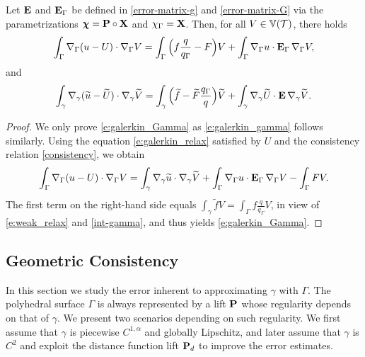 \begin{lemma}\label{L:GO}
Let ${\bf E}$ and ${\bf E}_\Gamma$ be defined in \eqref{error-matrix-g} and
  \eqref{error-matrix-G} via the parametrizations ${\boldsymbol \chi}={\bf P}\circ{\bf X}$
  and $\chi_\Gamma={\bf X}$. Then, for all $V \in \mathbb{V}(\mathcal{T})$, there holds
%
\begin{equation}\label{e:galerkin_Gamma}
\int_\Gamma \nabla_\Gamma (u-U) \cdot \nabla_\Gamma V = \int_\Gamma \Big(f \frac{q}{q_\Gamma}-F \Big) V + \int_\Gamma \nabla_\Gamma u \cdot {\bf E}_\Gamma \, \nabla_\Gamma V,
\end{equation}
and 
\begin{equation}\label{e:galerkin_gamma}
\int_\gamma \nabla_\gamma (\widetilde{u}-\widetilde{U}) \cdot \nabla_\gamma \widetilde{V} = \int_\gamma \Big (\widetilde f - \widetilde{F} \frac{q_\Gamma}{q} \Big) \widetilde{V} + \int_\gamma \nabla_\gamma \widetilde{U} \cdot {\bf E} \, \nabla_\gamma \widetilde{V}.
\end{equation}
%
\end{lemma}
%
\begin{proof}
We only prove \eqref{e:galerkin_Gamma} as \eqref{e:galerkin_gamma} follows similarly.
Using the equation \eqref{e:galerkin_relax} satisfied by $U$ and the consistency relation \eqref{consistency}, we obtain
%
\begin{align*}
\int_\Gamma \nabla_\Gamma (u-U) \cdot \nabla_\Gamma V
= \int_\gamma \nabla_\gamma \widetilde{u}\cdot \nabla_\gamma \widetilde{V} + \int_\Gamma \nabla_\Gamma u \cdot {\bf E}_\Gamma \, \nabla_\Gamma V- \int_\Gamma F V.
\end{align*}
%
The first term on the right-hand side
equals $\int_\gamma \widetilde f V = \int_\Gamma f \frac{q}{q_\Gamma} V$, in view
of \eqref{e:weak_relax} and \eqref{int-gamma}, and thus yields \eqref{e:galerkin_Gamma}.
\end{proof}
 
 
\subsection{Geometric Consistency}\label{S:geom_consistency}
%
In this section we study the error inherent to approximating $\gamma$ with $\Gamma$.
The polyhedral surface $\Gamma$
is always represented by a lift ${\bf P}$ whose regularity depends
on that of $\gamma$. We present two scenarios depending on such regularity. We
first assume that $\gamma$ is piecewise $C^{1,\alpha}$ and globally Lipschitz,
and later assume that $\gamma$ is $C^2$ and exploit the distance function lift
${\bf P}_d$ to improve the error estimates.


